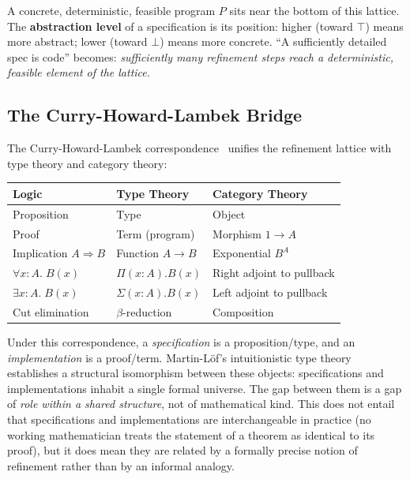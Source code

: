 \documentclass[11pt, a4paper, copyright]{googledeepmind}
\begin{document}
A concrete, deterministic, feasible program $P$ sits near the bottom of this lattice. The \textbf{abstraction level} of a specification is its position: higher (toward $\top$) means more abstract; lower (toward $\bot$) means more concrete. ``A sufficiently detailed spec is code'' becomes: \emph{sufficiently many refinement steps reach a deterministic, feasible element of the lattice.}

\subsection{The Curry-Howard-Lambek Bridge}

The Curry-Howard-Lambek correspondence~\citep{martinlof1979constructive, wadler2015propositions, lambek1986higher} unifies the refinement lattice with type theory and category theory:

\begin{center}
\begin{tabular}{lll}
\toprule
\textbf{Logic} & \textbf{Type Theory} & \textbf{Category Theory} \\
\midrule
Proposition & Type & Object \\
Proof & Term (program) & Morphism $1 \to A$ \\
Implication $A \Rightarrow B$ & Function $A \to B$ & Exponential $B^A$ \\
$\forall x{:}A.\; B(x)$ & $\Pi(x{:}A).B(x)$ & Right adjoint to pullback \\
$\exists x{:}A.\; B(x)$ & $\Sigma(x{:}A).B(x)$ & Left adjoint to pullback \\
Cut elimination & $\beta$-reduction & Composition \\
\bottomrule
\end{tabular}
\end{center}

Under this correspondence, a \emph{specification} is a proposition/type, and an \emph{implementation} is a proof/term. Martin-L\"{o}f's intuitionistic type theory~\citep{martinlof1979constructive} establishes a structural isomorphism between these objects: specifications and implementations inhabit a single formal universe. The gap between them is a gap of \emph{role within a shared structure}, not of mathematical kind. This does not entail that specifications and implementations are interchangeable in practice (no working mathematician treats the statement of a theorem as identical to its proof), but it does mean they are related by a formally precise notion of refinement rather than by an informal analogy.
\end{document}
